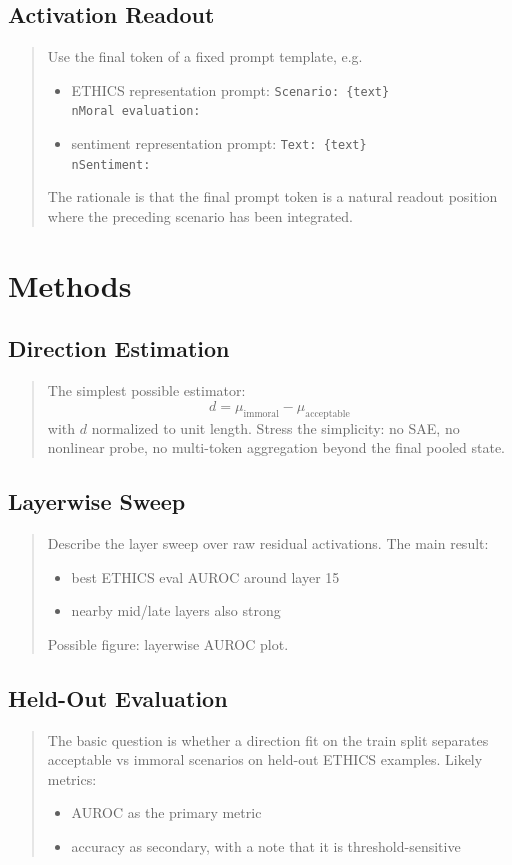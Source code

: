 \documentclass[11pt]{article}
\newcommand{\draftnote}[1]{%
  \begin{quote}\footnotesize\color{gray}#1\end{quote}%
}
\begin{document}
\subsection{Activation Readout}
\draftnote{
Use the final token of a fixed prompt template, e.g.
\begin{itemize}[leftmargin=1.5em]
    \item ETHICS representation prompt: \texttt{Scenario: \{text\}\\nMoral evaluation:}
    \item sentiment representation prompt: \texttt{Text: \{text\}\\nSentiment:}
\end{itemize}
The rationale is that the final prompt token is a natural readout position where the preceding scenario has been integrated.
}

\section{Methods}
\subsection{Direction Estimation}
\draftnote{
The simplest possible estimator:
\[
d = \mu_{\text{immoral}} - \mu_{\text{acceptable}}
\]
with $d$ normalized to unit length.
Stress the simplicity: no SAE, no nonlinear probe, no multi-token aggregation beyond the final pooled state.
}

\subsection{Layerwise Sweep}
\draftnote{
Describe the layer sweep over raw residual activations. The main result:
\begin{itemize}[leftmargin=1.5em]
    \item best ETHICS eval AUROC around layer 15
    \item nearby mid/late layers also strong
\end{itemize}
Possible figure: layerwise AUROC plot.
}

\subsection{Held-Out Evaluation}
\draftnote{
The basic question is whether a direction fit on the train split separates acceptable vs immoral scenarios on held-out ETHICS examples.
Likely metrics:
\begin{itemize}[leftmargin=1.5em]
    \item AUROC as the primary metric
    \item accuracy as secondary, with a note that it is threshold-sensitive
\end{itemize}
}
\end{document}
